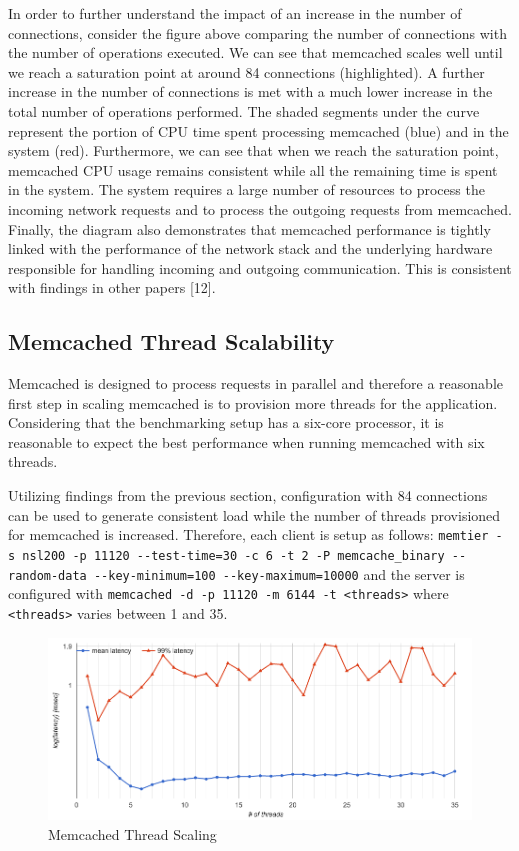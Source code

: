 In order to further understand the impact of an increase in the number
of connections, consider the figure above comparing the number of
connections with the number of operations executed. We can see that
memcached scales well until we reach a saturation point at around 84
connections (highlighted). A further increase in the number of
connections is met with a much lower increase in the total number of
operations performed. The shaded segments under the curve represent the
portion of CPU time spent processing memcached (blue) and in the system
(red). Furthermore, we can see that when we reach the saturation point,
memcached CPU usage remains consistent while all the remaining time is
spent in the system. The system requires a large number of resources to
process the incoming network requests and to process the outgoing
requests from memcached. Finally, the diagram also demonstrates that
memcached performance is tightly linked with the performance of the
network stack and the underlying hardware responsible for handling
incoming and outgoing communication. This is consistent with findings in
other papers {[}12{]}.

\subsection{Memcached Thread
Scalability}\label{memcached-thread-scalability}

Memcached is designed to process requests in parallel and therefore a
reasonable first step in scaling memcached is to provision more threads
for the application. Considering that the benchmarking setup has a
six-core processor, it is reasonable to expect the best performance when
running memcached with six threads.

Utilizing findings from the previous section, configuration with 84
connections can be used to generate consistent load while the number of
threads provisioned for memcached is increased. Therefore, each client
is setup as follows:
\texttt{memtier\ -s\ nsl200\ -p\ 11120\ -\/-test-time=30\ -c\ 6\ -t\ 2\ -P\ memcache\_binary\ -\/-random-data\ -\/-key-minimum=100\ -\/-key-maximum=10000}
and the server is configured with
\texttt{memcached\ -d\ -p\ 11120\ -m\ 6144\ -t\ \textless{}threads\textgreater{}}
where \texttt{\textless{}threads\textgreater{}} varies between 1 and 35.

\begin{figure}[htbp]
\centering
\includegraphics{./res/5_threads_latency.png}
\caption{Memcached Thread Scaling}
\end{figure}


